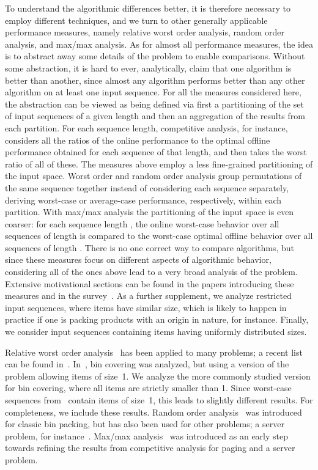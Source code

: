 \documentclass[11pt]{article}
\begin{document}
To understand the algorithmic differences better,
it is therefore necessary to employ different techniques,
and we turn to other generally applicable performance measures, namely
relative worst order analysis, random order analysis, and
max/max analysis.
As for almost all performance measures, the idea is to abstract away
some details of the problem to enable comparisons. Without some abstraction,
it is hard to ever, analytically, claim that one algorithm
is better than another, since almost any algorithm performs better
than any other algorithm on at least one input sequence.
For all the measures considered here, the abstraction can be viewed
as being defined via first a partitioning of the set of input sequences of a given length and then
an aggregation of the results from each partition.
For each sequence length, competitive analysis, for instance,
considers all the ratios of the online performance to the optimal
offline performance obtained for each sequence of that length,
and then takes the worst ratio of all of these.
The measures above employ a less fine-grained partitioning of the
input space.
Worst order and random order analysis group permutations of the same
sequence together instead of considering each sequence separately,
deriving worst-case or average-case performance, respectively, within each partition.
With max/max analysis the partitioning of the input space is even
coarser: for each sequence length , the online worst-case behavior
over all sequences of length  is compared to the worst-case optimal
offline behavior over all sequences of length .
There is no one correct way to compare algorithms,
but since these measures focus on different aspects of algorithmic behavior,
considering all of the ones above lead to a very broad analysis of the problem.
Extensive motivational sections can be found in the papers introducing
these measures and in the survey~\cite{DL05}.
As a further supplement, we analyze restricted input sequences, where
items have similar size, which is likely to happen in practice if one
is packing products with an origin in nature, for instance.
Finally, we consider input sequences containing items having uniformly distributed sizes.

Relative worst order analysis~\cite{BF07j,BFL07j} has been applied to
many problems; a recent list can be found
in~\cite{EKL13j}.
In~\cite{EFK12}, bin covering was analyzed, but using
a version of the problem allowing items of size~1.
We analyze the more commonly studied version for bin covering,
where all items are
strictly smaller than 1. Since worst-case sequences from~\cite{EFK12}
contain items of size~1, this leads to slightly different results.
For completeness, we include these results.
Random order analysis~\cite{K96}
was introduced for classic bin packing, but has also been used
for other problems; a server problem, for instance~\cite{BIL09p}.
Max/max analysis~\cite{BB94} was introduced
as an early step towards refining the results from competitive
analysis for paging and a server problem.
\end{document}
